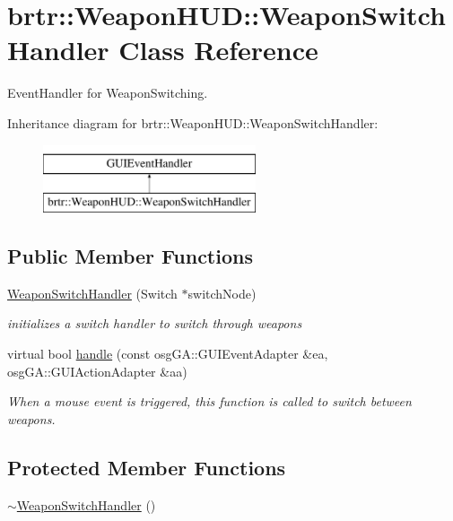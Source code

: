 \hypertarget{classbrtr_1_1_weapon_h_u_d_1_1_weapon_switch_handler}{\section{brtr\+:\+:Weapon\+H\+U\+D\+:\+:Weapon\+Switch\+Handler Class Reference}
\label{classbrtr_1_1_weapon_h_u_d_1_1_weapon_switch_handler}
}


Event\+Handler for Weapon\+Switching.  


Inheritance diagram for brtr\+:\+:Weapon\+H\+U\+D\+:\+:Weapon\+Switch\+Handler\+:\begin{figure}[H]
\begin{center}
\leavevmode
\includegraphics[height=2.000000cm]{classbrtr_1_1_weapon_h_u_d_1_1_weapon_switch_handler}
\end{center}
\end{figure}
\subsection*{Public Member Functions}
\begin{DoxyCompactItemize}
\item 
\hyperlink{classbrtr_1_1_weapon_h_u_d_1_1_weapon_switch_handler_a0f61e3aa44c58264e440186f1d7dbb0f}{Weapon\+Switch\+Handler} (Switch $\ast$switch\+Node)
\begin{DoxyCompactList}\small\item\em initializes a switch handler to switch through weapons \end{DoxyCompactList}\item 
virtual bool \hyperlink{classbrtr_1_1_weapon_h_u_d_1_1_weapon_switch_handler_ad3bd49035273e857144c1ad4927a22df}{handle} (const osg\+G\+A\+::\+G\+U\+I\+Event\+Adapter \&ea, osg\+G\+A\+::\+G\+U\+I\+Action\+Adapter \&aa)
\begin{DoxyCompactList}\small\item\em When a mouse event is triggered, this function is called to switch between weapons. \end{DoxyCompactList}\end{DoxyCompactItemize}
\subsection*{Protected Member Functions}
\begin{DoxyCompactItemize}
\item 
\hyperlink{classbrtr_1_1_weapon_h_u_d_1_1_weapon_switch_handler_a22b7a9e8884ac0c4a63979d6d441e58f}{$\sim$\+Weapon\+Switch\+Handler} ()
\end{DoxyCompactItemize}
